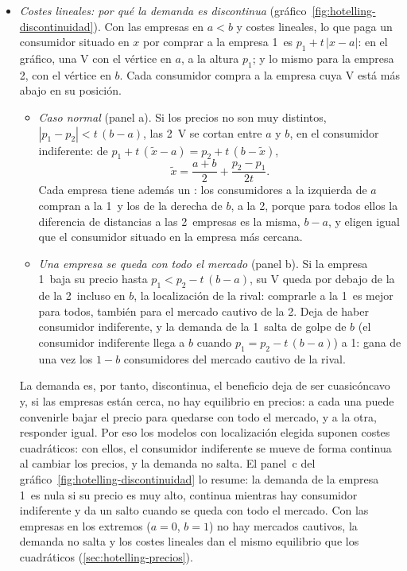 \documentclass[11pt]{article}
\begin{document}
\begin{itemize}
\item \emph{Costes lineales: por qué la demanda es discontinua} (gráfico~\ref{fig:hotelling-discontinuidad}). Con las empresas en $a<b$ y costes lineales, lo que paga un consumidor situado en $x$ por comprar a la empresa 1~es $p_1+t\,|x-a|$: en el gráfico, una V con el vértice en $a$, a la altura $p_1$; y lo mismo para la empresa 2, con el vértice en $b$. Cada consumidor compra a la empresa cuya V está más abajo en su posición.
  \begin{itemize}
  \item \emph{Caso normal} (panel a). Si los precios no son muy distintos, $|p_1-p_2|<t\,(b-a)$, las 2~V se cortan entre $a$ y $b$, en el consumidor indiferente: de $p_1+t\,(\tilde{x}-a)=p_2+t\,(b-\tilde{x})$,
    $$\tilde{x}=\frac{a+b}{2}+\frac{p_2-p_1}{2t}.$$
    Cada empresa tiene además un : los consumidores a la izquierda de $a$ compran a la 1~y los de la derecha de $b$, a la 2, porque para todos ellos la diferencia de distancias a las 2~empresas es la misma, $b-a$, y eligen igual que el consumidor situado en la empresa más cercana.
  \item \emph{Una empresa se queda con todo el mercado} (panel b). Si la empresa 1~baja su precio hasta $p_1<p_2-t\,(b-a)$, su V queda por debajo de la de la 2~incluso en $b$, la localización de la rival: comprarle a la 1~es mejor para todos, también para el mercado cautivo de la 2. Deja de haber consumidor indiferente, y la demanda de la 1~salta de golpe de $b$ (el consumidor indiferente llega a $b$ cuando $p_1=p_2-t\,(b-a)$) a 1: gana de una vez los $1-b$ consumidores del mercado cautivo de la rival.
  \end{itemize}
  La demanda es, por tanto, discontinua, el beneficio deja de ser cuasicóncavo y, si las empresas están cerca, no hay equilibrio en precios\nocite{dAspremontGabszewiczThisse1979Hotelling}: a cada una puede convenirle bajar el precio para quedarse con todo el mercado, y a la otra, responder igual. Por eso los modelos con localización elegida suponen costes cuadráticos: con ellos, el consumidor indiferente se mueve de forma continua al cambiar los precios, y la demanda no salta. El panel~c del gráfico~\ref{fig:hotelling-discontinuidad} lo resume: la demanda de la empresa 1~es nula si su precio es muy alto, continua mientras hay consumidor indiferente y da un salto cuando se queda con todo el mercado. Con las empresas en los extremos ($a=0$, $b=1$) no hay mercados cautivos, la demanda no salta y los costes lineales dan el mismo equilibrio que los cuadráticos (\ref{sec:hotelling-precios}).
\end{itemize}
\end{document}
